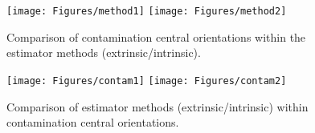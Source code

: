 \documentclass{article}\usepackage[]{graphicx}\usepackage[]{color}
\newenvironment{knitrout}{}{} %
\begin{document}
\begin{knitrout}
\color{fgcolor}\begin{figure}[]


{\centering \texttt{[image: Figures/method1]} 
\texttt{[image: Figures/method2]} 

}

\caption[Comparison of contamination central orientations within the estimator methods (extrinsic/intrinsic)]{Comparison of contamination central orientations within the estimator methods (extrinsic/intrinsic).\label{fig:method}}
\end{figure}


\end{knitrout}


\begin{knitrout}
\color{fgcolor}\begin{figure}[]


{\centering \texttt{[image: Figures/contam1]} 
\texttt{[image: Figures/contam2]} 

}

\caption[Comparison of estimator methods (extrinsic/intrinsic) within contamination central orientations]{Comparison of estimator methods (extrinsic/intrinsic) within contamination central orientations.\label{fig:contam}}
\end{figure}


\end{knitrout}
\end{document}

